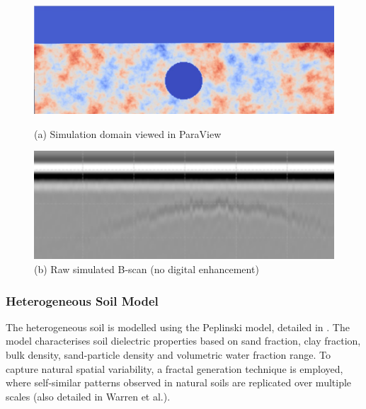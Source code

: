                 \begin{figure}[htbp]
            \centering
            \begin{minipage}[b]{0.48\textwidth}
                \centering
                \includegraphics[width=\textwidth]{figs/Rory/radar_domain.pdf}
                \caption{(a) Simulation domain viewed in ParaView }
                \label{fig:radar_domain}
            \end{minipage}
            \hfill
            \begin{minipage}[b]{0.48\textwidth}
                \centering
                \includegraphics[width=\textwidth]{figs/Rory/sim_bscan_cropped.png}
                \caption{(b) Raw simulated B-scan (no digital enhancement)}
                \label{fig:original_bscan}
            \end{minipage}
        \end{figure}
        \noindent 
    
    \subsubsection{Heterogeneous Soil Model}
    
        \noindent The heterogeneous soil is modelled using the Peplinski model, detailed in \cite{warren2016gprmax}. The model characterises soil dielectric properties based on sand fraction, clay fraction, bulk density, sand-particle density and volumetric water fraction range. To capture natural spatial variability, a fractal generation technique is employed, where self-similar patterns observed in natural soils are replicated over multiple scales (also detailed in Warren et al.).

